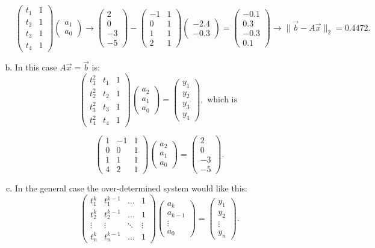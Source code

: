 \documentclass{article}
\newcommand{\normII}[1]{\|#1\|_2}
\newcommand{\pmat}[1]{\begin{pmatrix}#1\end{pmatrix}}
\begin{document}
\begin{enumerate}[(a)]
\[  \pmat{t_1 & 1\\
		t_2 & 1\\
		t_3 & 1\\
		t_4 & 1 }
  \pmat{a_1 \\ a_0} \to
  \pmat{2\\ 0\\ -3\\ -5} - 
  \pmat{-1 & 1\\
		0 & 1\\
		1 & 1\\
		2 & 1 }
   \pmat{-2.4 \\ -0.3} =
  \pmat{-0.1 \\ 0.3 \\ -0.3 \\ 0.1} \to \normII{\vec b-A\vec x} = 0.4472. \]
\newpage
\item In this case $A\vec x = \vec b$ is:
\[ \pmat{t_1^2 & t_1 & 1\\
		t_2^2 & t_2 & 1\\
		t_3^2 & t_3 & 1\\
		t_4^2 & t_4 & 1 }
   \pmat{a_2 \\ a_1 \\ a_0} =
   \pmat{y_1\\ y_2\\ y_3\\ y_4}, \text{ which is } \]

\[ \pmat{1 & -1 & 1\\
		0 & 0 & 1\\
		1 & 1 & 1\\
		4 & 2 & 1 }
   \pmat{a_2 \\ a_1 \\ a_0} =
   \pmat{2\\ 0\\ -3\\ -5}. \]
   
\item In the general case the over-determined system would like this:
\[ \pmat{t_1^k & t_1^{k-1} & \dots & 1\\
		t_2^k & t_2^{k-1} & \dots & 1\\
		\vdots & \vdots & \ddots & \vdots \\
		t_n^k & t_n^{k-1} & \dots & 1 }
   \pmat{a_k \\ a_{k-1} \\ \vdots \\ a_0} =
   \pmat{y_1\\ y_2\\ \vdots \\ y_n}. \]


\end{enumerate}
\end{document}
